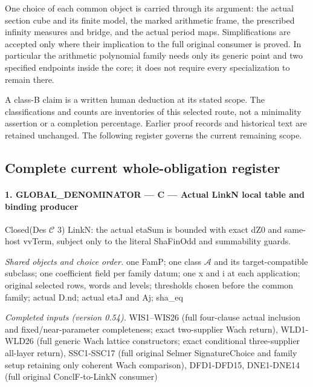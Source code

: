 \documentclass[11pt,a4paper]{article}
\numberwithin{equation}{section}
\theoremstyle{remark}\newtheorem{remark}[theorem]{Remark}
\begin{document}
One choice of each common object is carried through its argument:
the actual section cube and its finite model, the marked arithmetic
frame, the prescribed infinity measures and bridge, and the actual
period maps. Simplifications are accepted only where their implication
to the full original consumer is proved. In particular the arithmetic
polynomial family needs only its generic point and two specified
endpoints inside the core; it does not require every specialization
to remain there.

A class-B claim is a written human deduction at its stated scope.
The classifications and counts are inventories of this selected route,
not a minimality assertion or a completion percentage. Earlier proof
records and historical text are retained unchanged. The following
register governs the current remaining scope.

\subsection{Complete current whole-obligation register}

\paragraph{1. GLOBAL\_\allowbreak DENOMINATOR — C — Actual LinkN local table and binding producer}

Closed(Des $\mathcal C$ 3) LinkN: the actual etaSum is bounded with exact dZ0 and same-host vvTerm, subject only to the literal ShaFinOdd and summability guards.

\emph{Shared objects and choice order.} one FamP; one class $\mathcal A$ and its target-compatible subclass; one coefficient field per family datum; one x and i at each application; original selected rows, words and levels; thresholds chosen before the common family; actual D.nd; actual etaJ and Aj; sha\_\allowbreak eq

\emph{Completed inputs (version 0.54).} WIS1–WIS26 (full four-clause actual inclusion and fixed/near-parameter completeness; exact two-supplier Wach return), WLD1-WLD26 (full generic Wach lattice constructors; exact conditional three-supplier all-layer return), SSC1-SSC17 (full original Selmer SignatureChoice and family setup retaining only coherent Wach comparison), DFD1-DFD15, DNE1-DNE14 (full original ConclF-to-LinkN consumer)
\end{document}

